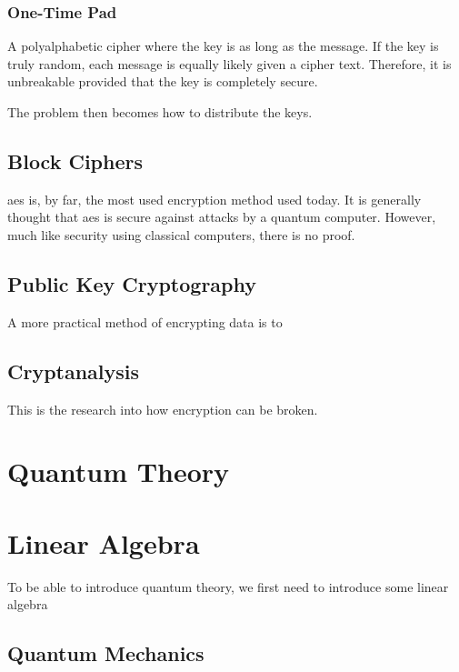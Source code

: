 \subsubsection*{One-Time Pad}

A polyalphabetic cipher where the key is as long as the message. If the key is truly random, each message is equally likely given a cipher text. Therefore, it is unbreakable provided that the key is completely secure.

The problem then becomes how to distribute the keys.

\subsection{Block Ciphers}

\Ac{aes} is, by far, the most used encryption method used today. It is generally thought that \ac{aes} is secure against attacks by a quantum computer. However, much like security using classical computers, there is no proof.

\subsection{Public Key Cryptography}

A more practical method of encrypting data is to 

\subsection{Cryptanalysis}
\label{sec1:cryptanalysis}

This is the research into how encryption can be broken.

\section{Quantum Theory}

\section{Linear Algebra}

To be able to introduce quantum theory, we first need to introduce some linear algebra 



\subsection{Quantum Mechanics}


